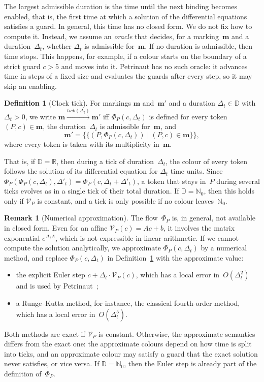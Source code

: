 \documentclass[11pt]{article}
\theoremstyle{definition}
\newcommand{\NatZero}{\mathbb{N}_0}
\newcommand{\Real}{\mathbb{R}}
\newcommand{\Dom}{\mathbb{D}}
\newcommand{\mset}[1]{\{\!\{#1\}\!\}}
\newcommand{\bfm}{\mathbf{m}}
\newcommand{\tickto}[1]{\xrightarrow{\mathit{tick}(#1)}}
\newtheorem{definition}{Definition}
\newtheorem{remark}{Remark}
\begin{document}
The largest admissible duration is the time until the next binding becomes
enabled, that is, the first time at which a solution of the differential
equations satisfies a guard. In general, this time has no closed form. We do
not fix how to compute it. Instead, we assume an \emph{oracle} that decides,
for a marking~$\bfm$ and a duration~$\Delta_t$, whether $\Delta_t$ is
admissible for~$\bfm$. If no duration is admissible, then time stops. This
happens, for example, if a colour starts on the boundary of a strict guard
$c > 5$ and moves into it. Petrinaut has no such oracle: it advances time in
steps of a fixed size and evaluates the guards after every step, so it may
skip an enabling.

\begin{definition}[Clock tick]\label{def:tick}
  For markings $\bfm$ and~$\bfm'$ and a duration $\Delta_t \in \Dom$ with $\Delta_t > 0$,
  we write $\bfm \tickto{\Delta_t} \bfm'$ iff $\Phi_P(c, \Delta_t)$ is defined for every
  token $(P, c) \in \bfm$, the duration~$\Delta_t$ is admissible
  for~$\bfm$, and
  \[
    \bfm' = \mset{(P, \Phi_P(c, \Delta_t)) \mid (P, c) \in \bfm},
  \]
  where every token is taken with its multiplicity in~$\bfm$.
\end{definition}

That is, if $\Dom = \Real$, then during a tick of duration~$\Delta_t$, the colour of
every token follows the solution of its differential equation for $\Delta_t$ time
units. Since $\Phi_P(\Phi_P(c, \Delta_t), \Delta'_t) = \Phi_P(c, \Delta_t + \Delta'_t)$, a token
that stays in~$P$ during several ticks evolves as in a single tick of their
total duration. If $\Dom = \NatZero$, then this holds only if
$\mathcal{V}_P$ is constant, and a tick is only possible if no colour
leaves~$\NatZero$.

\begin{remark}[Numerical approximation]\label{rem:approx}
  The flow~$\Phi_P$ is, in general, not available in closed form. Even for an
  affine $\mathcal{V}_P(c) = A c + b$, it involves the matrix exponential
  $e^{\Delta_t A}$, which is not expressible in linear arithmetic. If we cannot
  compute the solution analytically, we approximate $\Phi_P(c, \Delta_t)$ by a
  numerical method, and replace $\Phi_P(c, \Delta_t)$ in
  Definition~\ref{def:tick} with the approximate value:
  \begin{itemize}
    \item the explicit Euler step $c + \Delta_t \cdot \mathcal{V}_P(c)$, which has a
      local error in~$O(\Delta_t^2)$ and is used by Petrinaut~\cite{Petrinaut};
    \item a Runge--Kutta method, for instance, the classical fourth-order
      method, which has a local error in~$O(\Delta_t^5)$.
  \end{itemize}
  Both methods are exact if $\mathcal{V}_P$ is constant. Otherwise, the
  approximate semantics differs from the exact one: the approximate colours
  depend on how time is split into ticks, and an approximate colour may
  satisfy a guard that the exact solution never satisfies, or vice versa.
  If $\Dom = \NatZero$, then the Euler step is already part of the
  definition of~$\Phi_P$.
\end{remark}
\end{document}
